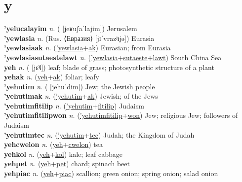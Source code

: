 \section{y}

\textbf{'yelucalayim} \textit{n.} ( [jeʁuʃaˈlajim])
Jerusalem \label{'yelucalayim} \\
\textbf{'yewlasia} \textit{n.} (Rus. ⟨Евразия⟩ [jɪˈvrazʲɪjə])
Eurasia \label{'yewlasia} \\
\textbf{'yewlasiaak} \textit{n.} (\hyperref['yewlasia]{'yewlasia}+\hyperref[ak]{ak})
Eurasian; from Eurasia \label{'yewlasiaak} \\
\textbf{'yewlasiasutaestelawt} \textit{n.} (\hyperref['yewlasia]{'yewlasia}+\hyperref[sutaeste]{sutaeste}+\hyperref[lawt]{lawt})
South China Sea \label{'yewlasiasutaestelawt} \\
\textbf{yeh} \textit{n.} ( [jɛ˥˩])
leaf; blade of grass; photosynthetic structure of a plant \label{yeh} \\
\textbf{yehak} \textit{n.} (\hyperref[yeh]{yeh}+\hyperref[ak]{ak})
foliar; leafy \label{yehak} \\
\textbf{'yehutim} \textit{n.} ( [jehuˈdim])
Jew; the Jewish people \label{'yehutim} \\
\textbf{'yehutimak} \textit{n.} (\hyperref['yehutim]{'yehutim}+\hyperref[ak]{ak})
Jewish; of the Jews \label{'yehutimak} \\
\textbf{'yehutimfitilip} \textit{n.} (\hyperref['yehutim]{'yehutim}+\hyperref[fitilip]{fitilip})
Judaism \label{'yehutimfitilip} \\
\textbf{'yehutimfitilipwon} \textit{n.} (\hyperref['yehutimfitilip]{'yehutimfitilip}+\hyperref[won]{won})
Jew; religious Jew; followers of Judaism \label{'yehutimfitilipwon} \\
\textbf{'yehutimtec} \textit{n.} (\hyperref['yehutim]{'yehutim}+\hyperref[tec]{tec})
Judah; the Kingdom of Judah \label{'yehutimtec} \\
\textbf{yehcwelon} \textit{n.} (\hyperref[yeh]{yeh}+\hyperref[cwelon]{cwelon})
tea \label{yehcwelon} \\
\textbf{yehkol} \textit{n.} (\hyperref[yeh]{yeh}+\hyperref[kol]{kol})
kale; leaf cabbage \label{yehkol} \\
\textbf{yehpet} \textit{n.} (\hyperref[yeh]{yeh}+\hyperref[pet]{pet})
chard; spinach beet \label{yehpet} \\
\textbf{yehpiac} \textit{n.} (\hyperref[yeh]{yeh}+\hyperref[piac]{piac})
scallion; green onion; spring onion; salad onion \label{yehpiac} \\

